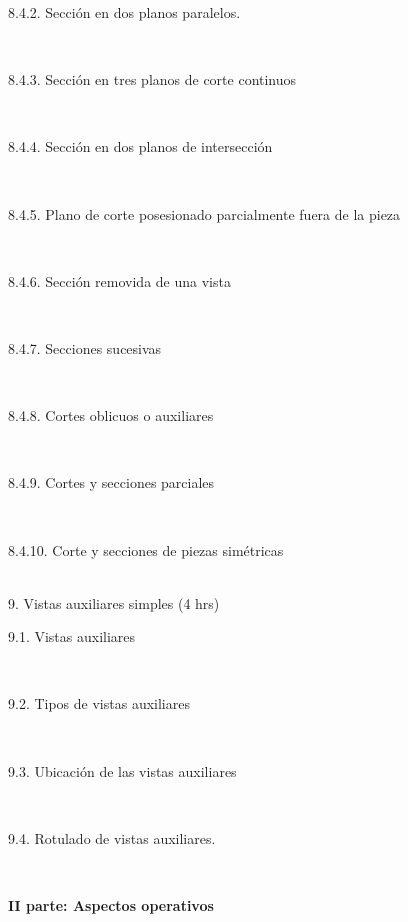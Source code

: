 \documentclass[letterpaper]{article}%
\begin{document}
\begin{tcolorbox}
\hspace*{0.04\linewidth}\parbox{0.96\linewidth}{\strut 8.4.2. Sección en dos planos paralelos.\strut}\\
\hspace*{0.04\linewidth}\parbox{0.96\linewidth}{\strut 8.4.3. Sección en tres planos de corte continuos\strut}\\
\hspace*{0.04\linewidth}\parbox{0.96\linewidth}{\strut 8.4.4. Sección en dos planos de intersección\strut}\\
\hspace*{0.04\linewidth}\parbox{0.96\linewidth}{\strut 8.4.5. Plano de corte posesionado parcialmente fuera de la pieza\strut}\\
\hspace*{0.04\linewidth}\parbox{0.96\linewidth}{\strut 8.4.6. Sección removida de una vista\strut}\\
\hspace*{0.04\linewidth}\parbox{0.96\linewidth}{\strut 8.4.7. Secciones sucesivas\strut}\\
\hspace*{0.04\linewidth}\parbox{0.96\linewidth}{\strut 8.4.8. Cortes oblicuos o auxiliares\strut}\\
\hspace*{0.04\linewidth}\parbox{0.96\linewidth}{\strut 8.4.9. Cortes y secciones parciales\strut}\\
\hspace*{0.04\linewidth}\parbox{0.96\linewidth}{\strut 8.4.10. Corte y secciones de piezas simétricas\strut}\\
9. Vistas auxiliares simples (4 hrs)\\
\hspace*{0.02\linewidth}\parbox{0.98\linewidth}{\strut 9.1. Vistas auxiliares\strut}\\
\hspace*{0.02\linewidth}\parbox{0.98\linewidth}{\strut 9.2. Tipos de vistas auxiliares\strut}\\
\hspace*{0.02\linewidth}\parbox{0.98\linewidth}{\strut 9.3. Ubicación de las vistas auxiliares\strut}\\
\hspace*{0.02\linewidth}\parbox{0.98\linewidth}{\strut 9.4. Rotulado de vistas auxiliares.\strut}\\ 
\end{tcolorbox}
%
\vspace*{10mm}%
\newpage%
\par\fontsize{14}{0}\selectfont \textbf{\textcolor{parte}{II parte: Aspectos operativos}}%
\end{document}
